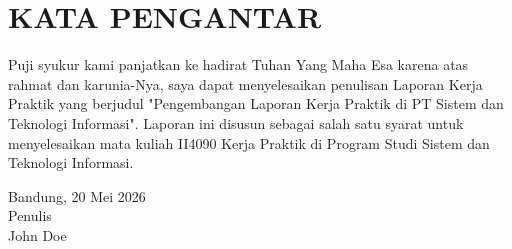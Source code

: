 \chapter*{KATA PENGANTAR}

Puji syukur kami panjatkan ke hadirat Tuhan Yang Maha Esa karena atas rahmat dan karunia-Nya, saya dapat menyelesaikan penulisan Laporan Kerja Praktik yang berjudul "Pengembangan Laporan Kerja Praktik di PT Sistem dan Teknologi Informasi". 
Laporan ini disusun sebagai salah satu syarat untuk menyelesaikan mata kuliah II4090 Kerja Praktik di Program Studi Sistem dan Teknologi Informasi.
\begin{flushright}
    Bandung, 20 Mei 2026\\
    
    Penulis \\
    \vspace{1cm}
    John Doe
\end{flushright}
